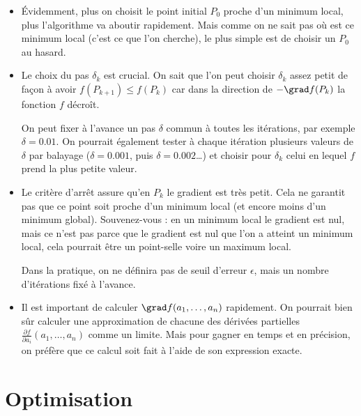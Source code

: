 \documentclass[11pt,class=report,crop=false]{standalone}
\begin{document}
\begin{remarque*}
\sauteligne
\begin{itemize}
  \item \'Evidemment, plus on choisit le point initial $P_0$ proche d'un minimum local, plus l'algorithme va aboutir rapidement. Mais comme on ne sait pas où est ce minimum local (c'est ce que l'on cherche), le plus simple est de choisir un $P_0$ au hasard.

  \item Le choix du pas $\delta_k$ est crucial. On sait que l'on peut choisir $\delta_k$ assez petit de façon à avoir $f(P_{k+1}) \le f(P_k)$ car dans la direction de $-\grad f(P_k)$ la fonction $f$ décroît.
  
  
  On peut fixer à l'avance un pas $\delta$ commun à toutes les itérations, par exemple $\delta = 0.01$. On pourrait également tester à chaque itération plusieurs valeurs de $\delta$ par balayage ($\delta = 0.001$, puis $\delta=0.002$\ldots) et choisir pour $\delta_k$ celui en lequel $f$ prend la plus petite valeur.
  
  \item Le critère d'arrêt assure qu'en $P_k$ le gradient est très petit. Cela ne garantit pas que ce point soit proche d'un minimum local (et encore moins d'un minimum global). Souvenez-vous : en un minimum local le gradient est nul, mais ce n'est pas parce que le gradient est nul que l'on a atteint un minimum local, cela pourrait être un point-selle voire un maximum local.
  
    Dans la pratique, on ne définira pas de seuil d'erreur $\epsilon$, mais un nombre d'itérations fixé à l'avance.
  
  \item Il est important de calculer $\grad f(a_1,\ldots,a_n)$ rapidement. On pourrait bien sûr calculer une approximation de chacune des dérivées partielles $\frac{\partial f}{\partial a_i}(a_1,\ldots,a_n)$ comme un limite. Mais pour gagner en temps et en précision, on préfère que ce calcul soit fait à l'aide de son expression exacte. 
  
\end{itemize}
\end{remarque*}



\section{Optimisation}
\end{document}

